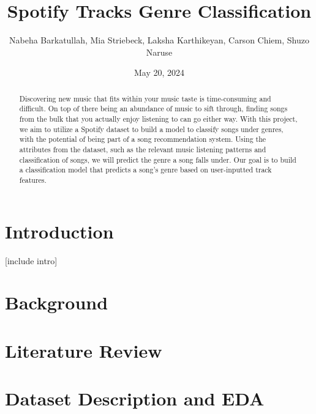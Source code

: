 \documentclass[times, twocolumn]{article}
\title{Spotify Tracks Genre Classification}
\author{Nabeha Barkatullah, Mia Striebeck, Laksha Karthikeyan, Carson Chiem, Shuzo Naruse}
\date{May 20, 2024}
\begin{document}
\maketitle

\newpage
\begin{abstract}
Discovering new music that fits within your music taste is time-consuming and difficult. On top of there being an abundance of music to sift through, finding songs from the bulk that you actually enjoy listening to can go either way. With this project, we aim to utilize a Spotify dataset to build a model to classify songs under genres, with the potential of being part of a song recommendation system. Using the attributes from the dataset, such as the relevant music listening patterns and classification of songs, we will predict the genre a song falls under. Our goal is to build a classification model that predicts a song’s genre based on user-inputted track features.
\end{abstract}
\section{Introduction}
[include intro]
\section{Background}
\section{Literature Review}
\newpage
\section{Dataset Description and EDA}
\end{document}
